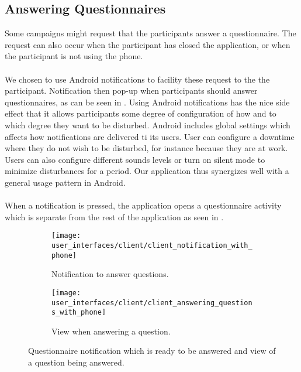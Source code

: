 \subsection{Answering Questionnaires}
\label{sub:answering_questionnaired}

Some campaigns might request that the participants answer a questionnaire. The request can also occur when the participant has closed the application, or when the participant is not using the phone. 
\\\\
We chosen to use Android notifications \parencite{android_notifications} to facility these request to the the participant. Notification then pop-up when participants should answer questionnaires, as can be seen in . Using Android notifications has the nice side effect that it allows participants some degree of configuration of how and to which degree they want to be disturbed. Android includes global settings which affects how notifications are delivered ti its users. User can configure a downtime where they do not wish to be disturbed, for instance because they are at work. Users can also configure different sounds levels or turn on silent mode to minimize disturbances for a period. Our application thus synergizes well with a general usage pattern in Android.     
\\\\
When a notification is pressed, the application opens a questionnaire activity which is separate from the rest of the application as seen in . 

\begin{figure}[!htbp]
    \begin{subfigure}[!t]{.50\textwidth}
        \centering
        \texttt{[image: user\_interfaces/client/client\_notification\_with\_phone]}
        \caption{Notification to answer questions.}
        \label{fig:answering_questionnaire_notification}
    \end{subfigure}%
    \begin{subfigure}[!t]{.50\textwidth}
        \centering
        \texttt{[image: user\_interfaces/client/client\_answering\_questions\_with\_phone]}
        \caption{View when answering a question.}
        \label{fig:answering_questionnaire_answering}
    \end{subfigure}
    \caption{Questionnaire notification which is ready to be answered and view of a question being answered.}
    \label{fig:answering_questionnaire}
\end{figure}
\FloatBarrier

